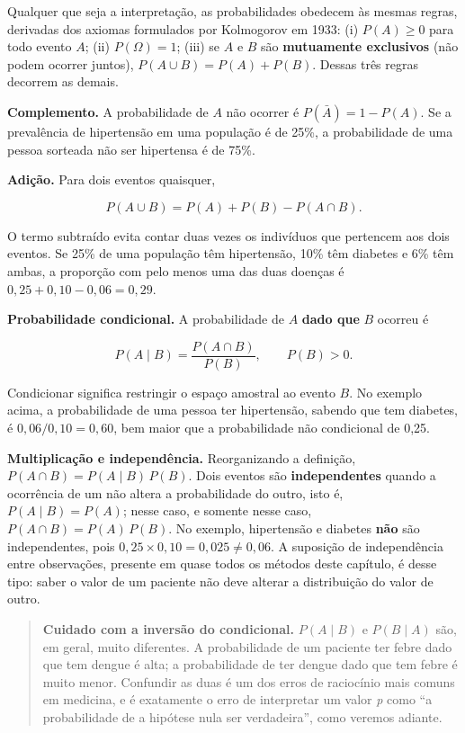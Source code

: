 \documentclass[
]{book}
\begin{document}
Qualquer que seja a interpretação, as probabilidades obedecem às mesmas regras, derivadas dos axiomas formulados por Kolmogorov em 1933: (i) \(P(A) \ge 0\) para todo evento \(A\); (ii) \(P(\Omega) = 1\); (iii) se \(A\) e \(B\) são \textbf{mutuamente exclusivos} (não podem ocorrer juntos), \(P(A \cup B) = P(A) + P(B)\). Dessas três regras decorrem as demais.

\textbf{Complemento.} A probabilidade de \(A\) não ocorrer é \(P(\bar{A}) = 1 - P(A)\). Se a prevalência de hipertensão em uma população é de 25\%, a probabilidade de uma pessoa sorteada não ser hipertensa é de 75\%.

\textbf{Adição.} Para dois eventos quaisquer,

\[
P(A \cup B) = P(A) + P(B) - P(A \cap B).
\]

O termo subtraído evita contar duas vezes os indivíduos que pertencem aos dois eventos. Se 25\% de uma população têm hipertensão, 10\% têm diabetes e 6\% têm ambas, a proporção com pelo menos uma das duas doenças é \(0{,}25 + 0{,}10 - 0{,}06 = 0{,}29\).

\textbf{Probabilidade condicional.} A probabilidade de \(A\) \textbf{dado que} \(B\) ocorreu é

\[
P(A \mid B) = \frac{P(A \cap B)}{P(B)}, \qquad P(B) > 0.
\]

Condicionar significa restringir o espaço amostral ao evento \(B\). No exemplo acima, a probabilidade de uma pessoa ter hipertensão, sabendo que tem diabetes, é \(0{,}06/0{,}10 = 0{,}60\), bem maior que a probabilidade não condicional de 0,25.

\textbf{Multiplicação e independência.} Reorganizando a definição, \(P(A \cap B) = P(A \mid B)\,P(B)\). Dois eventos são \textbf{independentes} quando a ocorrência de um não altera a probabilidade do outro, isto é, \(P(A \mid B) = P(A)\); nesse caso, e somente nesse caso, \(P(A \cap B) = P(A)\,P(B)\). No exemplo, hipertensão e diabetes \textbf{não} são independentes, pois \(0{,}25 \times 0{,}10 = 0{,}025 \neq 0{,}06\). A suposição de independência entre observações, presente em quase todos os métodos deste capítulo, é desse tipo: saber o valor de um paciente não deve alterar a distribuição do valor de outro.

\begin{quote}
\textbf{Cuidado com a inversão do condicional.} \(P(A \mid B)\) e \(P(B \mid A)\) são, em geral, muito diferentes. A probabilidade de um paciente ter febre dado que tem dengue é alta; a probabilidade de ter dengue dado que tem febre é muito menor. Confundir as duas é um dos erros de raciocínio mais comuns em medicina, e é exatamente o erro de interpretar um valor \emph{p} como ``a probabilidade de a hipótese nula ser verdadeira'', como veremos adiante.
\end{quote}
\end{document}
